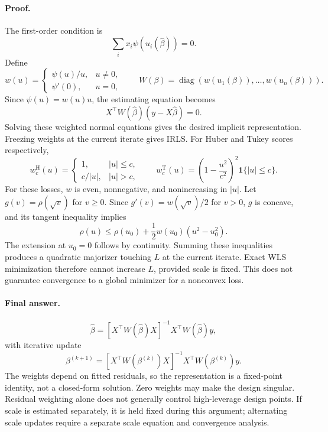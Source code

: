 \documentclass[answers,12pt,addpoints]{exam}
\providecommand{\diag}{\operatorname{diag}}
\providecommand{\ind}{\mathbf{1}}
\begin{document}
\begin{questions}
\begin{solution}
\paragraph{Proof.}
The first-order condition is
\[
\sum_i x_i\psi(u_i(\widehat\beta))=0.
\]
Define
\[
w(u)=\begin{cases}\psi(u)/u,&u\ne0,\\\psi'(0),&u=0,\end{cases}
\qquad
W(\beta)=\diag(w(u_1(\beta)),\ldots,w(u_n(\beta))).
\]
Since $\psi(u)=w(u)u$, the estimating equation becomes
\[
X^\top W(\widehat\beta)(y-X\widehat\beta)=0.
\]
Solving these weighted normal equations gives the desired implicit
representation. Freezing weights at the current iterate gives IRLS.
For Huber and Tukey scores respectively,
\[
w_c^{\mathrm H}(u)=\begin{cases}1,&|u|\leq c,\\c/|u|,&|u|>c,\end{cases}
\qquad
w_c^{\mathrm T}(u)=\left(1-\frac{u^2}{c^2}\right)^2\ind\{|u|\leq c\}.
\]
For these losses, $w$ is even, nonnegative, and nonincreasing in
$|u|$. Let $g(v)=\rho(\sqrt v)$ for $v\geq0$. Since
$g'(v)=w(\sqrt v)/2$ for $v>0$, $g$ is concave, and its tangent
inequality implies
\[
\rho(u)\leq\rho(u_0)+\frac12w(u_0)(u^2-u_0^2).
\]
The extension at $u_0=0$ follows by continuity. Summing these
inequalities produces a quadratic majorizer touching $L$ at the
current iterate. Exact WLS minimization therefore cannot increase
$L$, provided scale is fixed. This does not guarantee convergence
to a global minimizer for a nonconvex loss.

\paragraph{Final answer.}
\[
\boxed{\widehat\beta
=[X^\top W(\widehat\beta)X]^{-1}X^\top W(\widehat\beta)y,}
\]
with iterative update
\[
\boxed{\beta^{(k+1)}
=[X^\top W(\beta^{(k)})X]^{-1}X^\top W(\beta^{(k)})y.}
\]
The weights depend on fitted residuals, so the representation is a
fixed-point identity, not a closed-form solution. Zero weights may
make the design singular. Residual weighting alone does not generally
control high-leverage design points. If scale is estimated separately,
it is held fixed during this argument; alternating scale updates
require a separate scale equation and convergence analysis.
\end{solution}

\end{questions}
\end{document}
